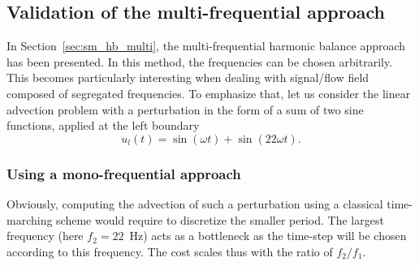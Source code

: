 \subsection{Validation of the multi-frequential approach}

In Section~\ref{sec:sm_hb_multi}, the multi-frequential harmonic
balance approach has been presented. In this method,
the frequencies can be chosen arbitrarily. This becomes particularly
interesting when dealing with signal/flow field composed of segregated
frequencies. To emphasize that, let us consider the linear advection problem
with a perturbation 
in the form of a sum of two sine functions,
applied at the left boundary
\begin{equation}
    u_l(t) = \sin(\omega t) + \sin(22 \omega t).
    \label{eq:multifreq_inj_func}
\end{equation}

\subsubsection{Using a mono-frequential approach}

Obviously, computing the advection of such a perturbation using
a classical time-marching scheme would require to discretize the
smaller period. The largest frequency
(here $f_2 = 22$~Hz) acts as a bottleneck as the time-step will be chosen
according to this frequency. The cost scales thus with the ratio of $f_2 / f_1$.

